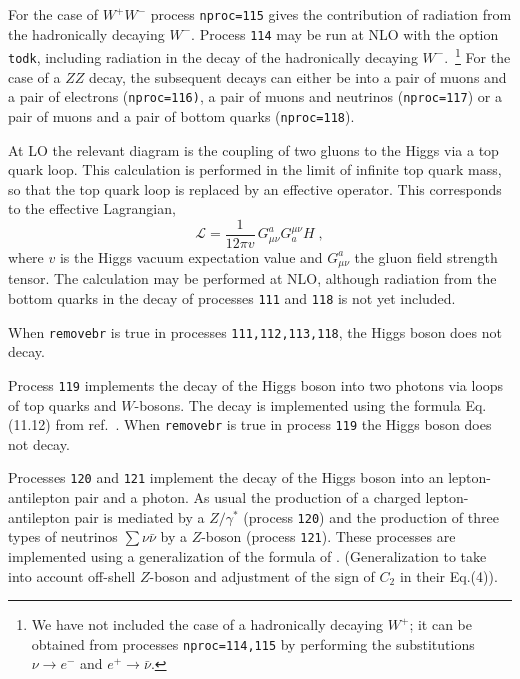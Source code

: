 For the case of $W^+W^-$ process {\tt nproc=115} gives the contribution 
of radiation from the hadronically decaying $W^-$.
Process {\tt 114} may be run at NLO with the option {\tt todk},
including radiation in the decay of the hadronically decaying $W^-$.~\footnote{
We have not included the case of a hadronically decaying $W^+$; it can
be obtained from processes {\tt nproc=114,115} by performing the
substitutions $\nu \to e^-$ and $e^+ \to \bar{\nu}$.}
For the case of a $ZZ$ decay,
the subsequent decays can either be into a pair of muons and a pair of electrons
({\tt nproc=116)}, a pair of muons and neutrinos ({\tt nproc=117}) or
a pair of muons and a pair of bottom quarks ({\tt nproc=118}).

At LO the relevant diagram
is the coupling of two gluons to the Higgs via a top quark loop.
This calculation is performed in the limit of infinite top quark mass, so that 
the top quark loop is replaced by an effective operator. This corresponds
to the effective Lagrangian,
\begin{equation}
\mathcal{L} = \frac{1}{12\pi v} \, G^a_{\mu\nu} G^{\mu\nu}_a H \;,
\label{eq:HeffL}
\end{equation}
where $v$ is the Higgs vacuum expectation value and $G^a_{\mu\nu}$ the
gluon field strength tensor.
The calculation may be performed at NLO, although radiation from the
bottom quarks in the decay of processes {\tt 111} and {\tt 118} is not yet included.


When {\tt removebr} is true in processes {\tt 111,112,113,118},
the Higgs boson does not decay.

Process {\tt 119} implements the decay of the Higgs boson into two photons
via loops of top quarks and $W$-bosons.
The decay is implemented using the formula Eq.(11.12) from ref.~\cite{Ellis:1991qj}.
When {\tt removebr} is true in process {\tt 119} the Higgs boson does not decay.

Processes {\tt 120} and {\tt 121} implement the decay of the Higgs boson into an lepton-antilepton
pair and a photon. As usual the production of a charged lepton-antilepton pair is mediated by a 
$Z/\gamma^*$ (process {\tt 120}) and the production of three types of neutrinos 
$\sum  \nu \bar{\nu}$ by a $Z$-boson (process {\tt 121}). These processes are implemented 
using a generalization of the formula of \cite{Djouadi:1996yq}. (Generalization to take into
account off-shell $Z$-boson and adjustment of the sign of $C_2$ in their Eq.(4)).


